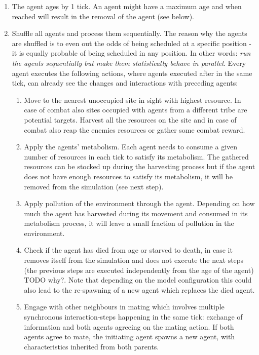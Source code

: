 \begin{enumerate}
	\item The agent ages by 1 tick. An agent might have a maximum age and when reached will result in the removal of the agent (see below).
	
	\item Shuffle all agents and process them sequentially. The reason why the agents are shuffled is to even out the odds of being scheduled at a specific position - it is equally probable of being scheduled in any position. In other words: \textit{run the agents sequentially but make them statistically behave in parallel}. Every agent executes the following actions, where agents executed after in the same tick, can already see the changes and interactions with preceding agents:
	
	\begin{enumerate}
		\item Move to the nearest unoccupied site in sight with highest resource. In case of combat also sites occupied with agents from a different tribe are potential targets. Harvest all the resources on the site and in case of combat also reap the enemies resources or gather some combat reward.

		\item Apply the agents' metabolism. Each agent needs to consume a given number of resources in each tick to satisfy its metabolism. The gathered resources can be stocked up during the harvesting process but if the agent does not have enough resources to satisfy its metabolism, it will be removed from the simulation (see next step).
		
		\item Apply pollution of the environment through the agent. Depending on how much the agent has harvested during its movement and consumed in its metabolism process, it will leave a small fraction of pollution in the environment.
		
		\item Check if the agent has died from age or starved to death, in case it removes itself from the simulation and does not execute the next steps (the previous steps are executed independently from the age of the agent) TODO why?. Note that depending on the model configuration this could also lead to the re-spawning of a new agent which replaces the died agent.
		
		\item Engage with other neighbours in mating which involves multiple synchronous interaction-steps happening in the same tick: exchange of information and both agents agreeing on the mating action. If both agents agree to mate, the initiating agent spawns a new agent, with characteristics inherited from both parents.
		

\end{enumerate}
\end{enumerate}
